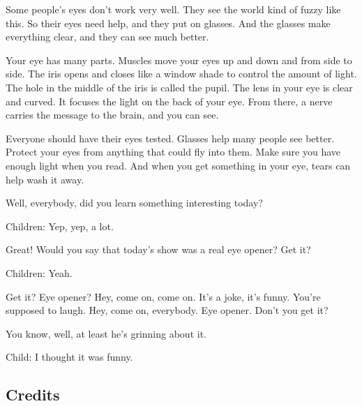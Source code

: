 Some people's eyes don't work very well. They see the world kind of fuzzy like this. So their eyes need help, and they put on glasses. And the glasses make everything clear, and they can see much better.

Your eye has many parts. Muscles move your eyes up and down and from side to side. The iris opens and closes like a window shade to control the amount of light. The hole in the middle of the iris is called the pupil. The lens in your eye is clear and curved. It focuses the light on the back of your eye. From there, a nerve carries the message to the brain, and you can see.

Everyone should have their eyes tested. Glasses help many people see better. Protect your eyes from anything that could fly into them. Make sure you have enough light when you read. And when you get something in your eye, tears can help wash it away.

Well, everybody, did you learn something interesting today?

Children: Yep, yep, a lot.

Great! Would you say that today's show was a real eye opener? Get it?

Children: Yeah.

Get it? Eye opener? Hey, come on, come on. It's a joke, it's funny. You're supposed to laugh. Hey, come on, everybody. Eye opener. Don't you get it?

You know, well, at least he's grinning about it.

Child: I thought it was funny.

\subsection{Credits}